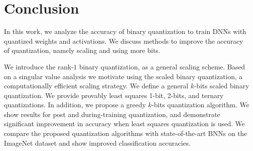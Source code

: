 \documentclass[10pt,twocolumn,letterpaper]{article}
\begin{document}
\section{Conclusion}
In this work, we analyze the accuracy of binary quantization to train DNNs with quantized weights and activations. We discuss methods to improve the accuracy of quantization, namely scaling and using more bits. 

We introduce the rank-$1$ binary quantization, as a general scaling scheme. Based on a singular value analysis we motivate using the scaled binary quantization, a computationally efficient scaling strategy. We define a general $k$-bits scaled binary quantization. We provide provably least squares 1-bit, 2-bits, and ternary quantizations. In addition, we propose a greedy $k$-bits quantization algorithm. We show results for post and during-training quantization, and demonstrate significant improvement in accuracy when least squares quantization is used. We compare the proposed quantization algorithms with state-of-the-art BNNs on the ImageNet dataset and show improved classification accuracies.

\appendix
\end{document}

